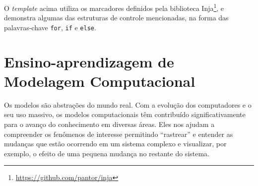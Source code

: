 \documentclass[
	12pt,				%
	openright,			%
	oneside,			%
	a4paper,			%
	main=brazil,
	english,			%
	]{ufsj-abntex2}
\begin{document}
O \textit{template} acima utiliza os marcadores definidos pela biblioteca Inja\footnote{\href{https://github.com/pantor/inja}{https://github.com/pantor/inja}}, e demonstra algumas das estruturas de controle mencionadas, na forma das palavras-chave \texttt{\textcolor{codepurple}{for}}, \texttt{\textcolor{codepurple}{if}} e \texttt{\textcolor{codepurple}{else}}.






\section{Ensino-aprendizagem de Modelagem Computacional} %


Os modelos são abstrações do mundo real. Com a evolução dos computadores e o seu uso massivo, os modelos computacionais têm contribuído significativamente para o avanço do conhecimento em diversas áreas. Eles nos ajudam a compreender os fenômenos de interesse permitindo “rastrear” e entender as mudanças que estão ocorrendo em um sistema complexo e visualizar, por exemplo, o efeito de uma pequena mudança no restante do sistema. 
\end{document}
